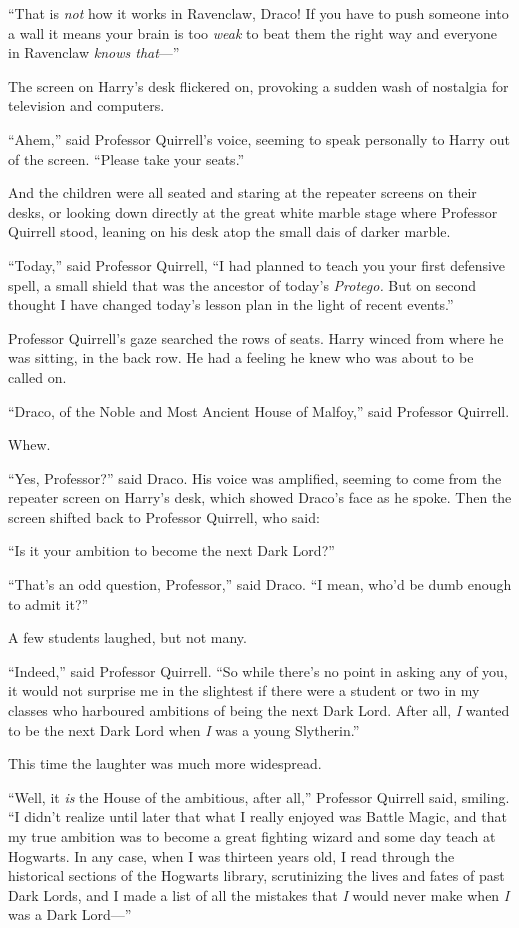 “That is \emph{not} how it works in Ravenclaw, Draco! If you have to push someone into a wall it means your brain is too \emph{weak} to beat them the right way and everyone in Ravenclaw \emph{knows that}—”

The screen on Harry’s desk flickered on, provoking a sudden wash of nostalgia for television and computers.

“Ahem,” said Professor Quirrell’s voice, seeming to speak personally to Harry out of the screen. “Please take your seats.”

\later

And the children were all seated and staring at the repeater screens on their desks, or looking down directly at the great white marble stage where Professor Quirrell stood, leaning on his desk atop the small dais of darker marble.

“Today,” said Professor Quirrell, “I had planned to teach you your first defensive spell, a small shield that was the ancestor of today’s \emph{Protego.} But on second thought I have changed today’s lesson plan in the light of recent events.”

Professor Quirrell’s gaze searched the rows of seats. Harry winced from where he was sitting, in the back row. He had a feeling he knew who was about to be called on.

“Draco, of the Noble and Most Ancient House of Malfoy,” said Professor Quirrell.

Whew.

“Yes, Professor?” said Draco. His voice was amplified, seeming to come from the repeater screen on Harry’s desk, which showed Draco’s face as he spoke. Then the screen shifted back to Professor Quirrell, who said:

“Is it your ambition to become the next Dark Lord?”

“That’s an odd question, Professor,” said Draco. “I mean, who’d be dumb enough to admit it?”

A few students laughed, but not many.

“Indeed,” said Professor Quirrell. “So while there’s no point in asking any of you, it would not surprise me in the slightest if there were a student or two in my classes who harboured ambitions of being the next Dark Lord. After all, \emph{I} wanted to be the next Dark Lord when \emph{I} was a young Slytherin.”

This time the laughter was much more widespread.

“Well, it \emph{is} the House of the ambitious, after all,” Professor Quirrell said, smiling. “I didn’t realize until later that what I really enjoyed was Battle Magic, and that my true ambition was to become a great fighting wizard and some day teach at Hogwarts. In any case, when I was thirteen years old, I read through the historical sections of the Hogwarts library, scrutinizing the lives and fates of past Dark Lords, and I made a list of all the mistakes that \emph{I} would never make when \emph{I} was a Dark Lord—”

